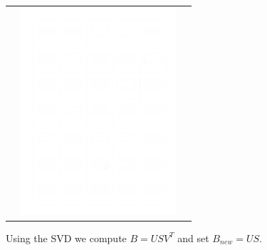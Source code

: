 \documentclass{beamer}
\begin{document}
\begin{frame}
\begin{center}
\begin{tabular}{ccc}
			& \includegraphics*[scale=0.23]{figures/FD3_white.png} 
			\\
		\end{tabular} 
	\end{center}
	Using the SVD we compute $B=USV^T$ and set $B_{new}=US$. 
\end{frame}
\end{document}
